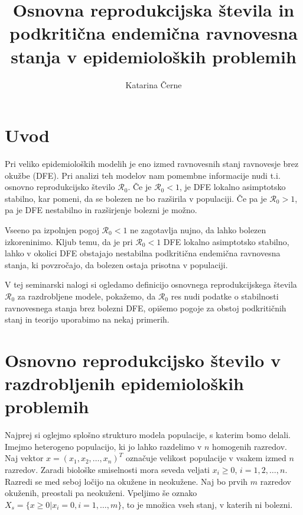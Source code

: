 \documentclass[a4paper,12pt]{article}
\newcommand{\todo}[1]{{\color{red}{#1}}}
\newcommand{\R}{\mathcal R}
\begin{document}
\title{Osnovna reprodukcijska števila in podkritična endemična ravnovesna stanja v epidemioloških problemih}
\author{Katarina Černe}
\maketitle

\section{Uvod}

Pri veliko epidemioloških modelih je eno izmed ravnovesnih stanj ravnovesje brez okužbe (DFE). 
Pri analizi teh modelov nam pomembne informacije nudi t.i. osnovno reprodukcijsko 
število \(\R_0\). Če je \(\R_0<1\), je DFE lokalno asimptotsko stabilno, kar pomeni,
da se bolezen ne bo razširila v populaciji. Če pa je \(\R_0>1\), pa je DFE nestabilno
in razširjenje bolezni je možno.

Vseeno pa izpolnjen pogoj \(\R_0<1\) ne zagotavlja nujno, da lahko bolezen izkoreninimo.
Kljub temu, da je pri \(\R_0<1\) DFE lokalno asimptotsko stabilno, lahko v okolici
DFE obstajajo nestabilna podkritična endemična ravnovesna stanja, ki povzročajo, da 
bolezen ostaja prisotna v populaciji. \todo{kaj je res s tem}

V tej seminarski nalogi si ogledamo definicijo osnovnega reprodukcijskega števila 
\(\R_0\) za razdrobljene modele, pokažemo, da \(\R_0\) res nudi podatke o stabilnosti
ravnovesnega stanja brez bolezni DFE, opišemo pogoje za obstoj podkritičnih stanj
in teorijo uporabimo na nekaj primerih.

\section{Osnovno reprodukcijsko število v razdrobljenih epidemioloških problemih} \label{r0}

Najprej si oglejmo splošno strukturo modela populacije, s katerim bomo delali.
Imejmo heterogeno populacijo, ki jo lahko razdelimo v \(n\) homogenih razredov.
Naj vektor \(x=(x_1,x_2,\ldots,x_n)^T\) označuje velikost populacije v vsakem 
izmed \(n\) razredov. Zaradi biološke smiselnosti mora seveda veljati \(x_i\geq 0\),
\(i=1,2,\ldots,n\). Razredi se med seboj ločijo na okužene in neokužene. 
Naj bo prvih \(m\) razredov okuženih, preostali pa neokuženi. Vpeljimo še oznako
\(X_s=\{x\geq 0 | x_i=0, i=1,\ldots, m\}\), to je množica vseh stanj, v katerih
ni bolezni. \todo{nove okužbe}
\end{document}
